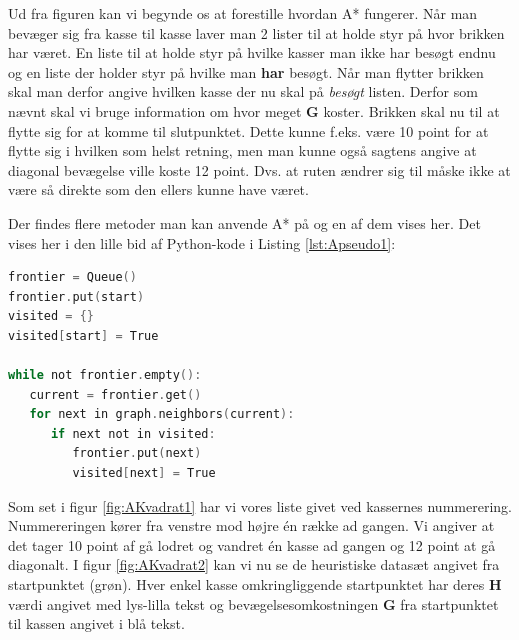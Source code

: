 Ud fra figuren kan vi begynde os at forestille hvordan A* fungerer. Når man bevæger sig fra kasse til kasse laver man 2 lister til at holde styr på hvor brikken har været. En liste til at holde styr på hvilke kasser man ikke har besøgt endnu og en liste der holder styr på hvilke man \textbf{har} besøgt. Når man flytter brikken skal man derfor angive hvilken kasse der nu skal på \textit{besøgt} listen. Derfor som nævnt skal vi bruge information om hvor meget \textbf{G} koster. Brikken skal nu til at flytte sig for at komme til slutpunktet. Dette kunne f.eks. være 10 point for at flytte sig i hvilken som helst retning, men man kunne også sagtens angive at diagonal bevægelse ville koste 12 point. Dvs. at ruten ændrer sig til måske ikke at være så direkte som den ellers kunne have været.

\vspace{5mm}

Der findes flere metoder man kan anvende A* på og en af dem vises her.
Det vises her i den lille bid af Python-kode i Listing \ref{lst:Apseudo1}:
\begin{lstlisting}[caption={A stjerne og pseudo-kode af brug af lister},label={lst:Apseudo1},language=C]
frontier = Queue()
frontier.put(start)
visited = {}
visited[start] = True

while not frontier.empty():
   current = frontier.get()
   for next in graph.neighbors(current):
      if next not in visited:
         frontier.put(next)
         visited[next] = True
\end{lstlisting}
\cite{stanfordredblobgamesAstar}

Som set i figur \ref{fig:AKvadrat1} har vi vores liste givet ved kassernes nummerering. Nummereringen kører fra venstre mod højre én række ad gangen. Vi angiver at det tager 10 point af gå lodret og vandret én kasse ad gangen og 12 point at gå diagonalt. I figur \ref{fig:AKvadrat2} kan vi nu se de heuristiske datasæt angivet fra startpunktet (grøn). Hver enkel kasse omkringliggende startpunktet har deres \textbf{H} værdi angivet med lys-lilla tekst og bevægelsesomkostningen \textbf{G} fra startpunktet til kassen angivet i blå tekst.

